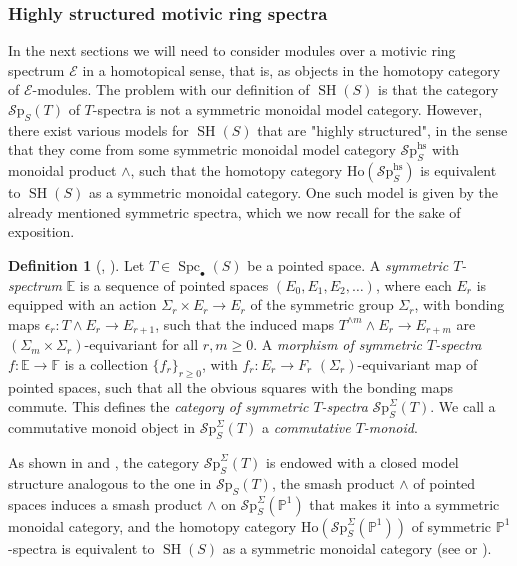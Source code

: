 \documentclass[10pt]{amsart}
\theoremstyle{definition}
\newtheorem{defn}{Definition}[section]
\theoremstyle{plain}
\numberwithin{equation}{section}
\newcommand{\0}{\emptyset}
\newcommand{\sE}{{\mathcal E}}
\newcommand{\E}{{\mathbb E}}
\newcommand{\F}{{\mathbb F}}
\renewcommand{\P}{{\mathbb P}}
\newcommand{\SH}{{\operatorname{SH}}}
\newcommand{\Spc}{{\operatorname{Spc}}}
\newcommand{\SPP}{{\mathcal{S}\text{p}}}
\begin{document}
\subsubsection{Highly structured motivic ring spectra}
\label{subsection:HighlyStructuredRings}

In the next sections we will need to consider modules over a motivic ring spectrum $\sE$ in a homotopical sense, that is, as objects in the homotopy category of $\sE$-modules. The problem with our definition of $\SH(S)$ is that the category $\SPP_S(T)$ of $T$-spectra is not a symmetric monoidal model category. However, there exist various models for $\SH(S)$ that are "highly structured", in the sense that they come from some symmetric monoidal model category $\SPP^{\text{hs}}_S$ with monoidal product $\wedge$, such that the homotopy category $\text{Ho}(\SPP_S^{\text{hs}})$ is equivalent to $\SH(S)$ as a symmetric monoidal category. One such model is given by the already mentioned symmetric spectra, which we now recall for the sake of exposition.

\begin{defn}[\cite{Jardine:SymSpectra}, \cite{Hovey:SymmSpectra}]
     Let $T \in \Spc_{\bullet}(S)$ be a pointed space. A \emph{symmetric $T$-spectrum} $\E$ is a sequence of pointed spaces $(E_0,E_1, E_2, \ldots)$, where each $E_r$ is equipped with an action $\Sigma_r \times E_r \to E_r$ of the symmetric group $\Sigma_r$, with bonding maps $\epsilon_r:T \wedge E_r \to E_{r+1}$, such that the induced maps $T^{\wedge m}\wedge E_r \to E_{r+m}$ are $(\Sigma_m \times \Sigma_r)$-equivariant for all $r,m \ge 0$. A \emph{morphism of symmetric $T$-spectra} $f:\E \to \F$ is a collection $\{f_r\}_{r \ge 0}$, with $f_r:E_r \to F_r$ $(\Sigma_r)$-equivariant map of pointed spaces, such that all the obvious squares with the bonding maps commute. This defines the \emph{category of symmetric $T$-spectra} $\SPP^\Sigma_S(T)$. We call a commutative monoid object in $\SPP^\Sigma_S(T)$ a \emph{commutative $T$-monoid}.
\end{defn}

As shown in \cite{Jardine:SymSpectra} and \cite{Hovey:SymmSpectra}, the category $\SPP^\Sigma_S(T)$ is endowed with a closed model structure analogous to the one in $\SPP_S(T)$, the smash product $\wedge$ of pointed spaces induces a smash product $\wedge$ on $\SPP^\Sigma_S(\P^1)$ that makes it into a symmetric monoidal category, and the homotopy category $\text{Ho}(\SPP^\Sigma_S(\P^1))$ of symmetric $\P^1$-spectra is equivalent to $\SH(S)$ as a symmetric monoidal category (see \cite[\S 4.4]{Jardine:SymSpectra} or \cite[\S 4]{Hovey:SymmSpectra}).
\end{document}
